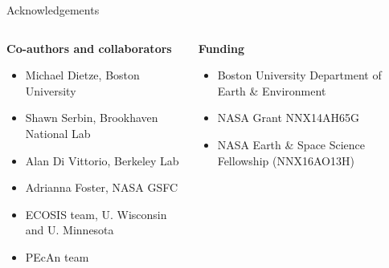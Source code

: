 \documentclass{beamer}\usepackage[]{graphicx}\usepackage[]{color}
\begin{document}
\begin{frame}{Acknowledgements}
  \begin{columns}[t]
    \begin{column}{0.5\textwidth}
      \textbf{Co-authors and collaborators}
      \begin{itemize}
        \item Michael Dietze, Boston University
        \item Shawn Serbin, Brookhaven National Lab
        \item Alan Di Vittorio, Berkeley Lab
        \item Adrianna Foster, NASA GSFC
        \item ECOSIS team, U. Wisconsin and U. Minnesota
        \item PEcAn team
      \end{itemize}
    \end{column}
    \begin{column}{0.5\textwidth}
      \textbf{Funding}
      \begin{itemize}
        \item Boston University Department of Earth \& Environment
        \item NASA Grant NNX14AH65G
        \item NASA Earth \& Space Science Fellowship (NNX16AO13H)
      \end{itemize}
    \end{column}
  \end{columns}
\end{frame}

\end{document}
